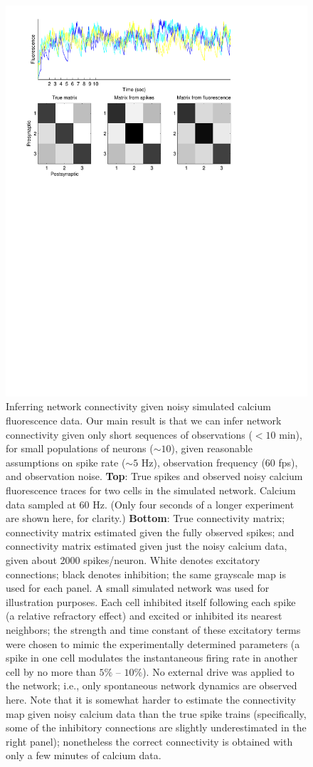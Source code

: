 \begin{figure}[h!] 
\begin{center} 
\includegraphics[width=0.7\linewidth]{../figs/SimConnector} 
\caption{Inferring network connectivity given noisy simulated calcium fluorescence data. Our main result is that we can infer network connectivity given only short sequences of observations ($<10$ min), for small populations of neurons ($\sim 10$), given reasonable assumptions on spike rate ($\sim 5$ Hz), observation frequency ($60$ fps), and observation noise. \textbf{Top}: True spikes and observed noisy calcium fluorescence traces for two cells in the simulated network.  Calcium data sampled at 60 Hz.  (Only four seconds of a longer experiment are shown here, for clarity.)  \textbf{Bottom}: True connectivity matrix; connectivity matrix estimated given the fully observed spikes; and connectivity matrix estimated given just the noisy calcium data, given about 2000 spikes/neuron.  White denotes excitatory connections; black denotes inhibition; the same grayscale map is used for each panel.  A small simulated network was used for illustration purposes.  Each cell inhibited itself following each spike (a relative refractory effect) and excited or inhibited its nearest neighbors; the strength and time constant of these excitatory terms were chosen to mimic the experimentally determined parameters (a spike in one cell modulates the instantaneous firing rate in another cell by no more than $5\%$ -- $10\%$).  No external drive was applied to the network; i.e., only spontaneous network dynamics are observed here.  Note that it is somewhat harder to estimate the connectivity map given noisy calcium data than the true spike trains (specifically, some of the inhibitory connections are slightly underestimated in the right panel); nonetheless the correct connectivity is obtained with only a few minutes of calcium data.} \label{fig:gibbs} 
\end{center}
\end{figure}
